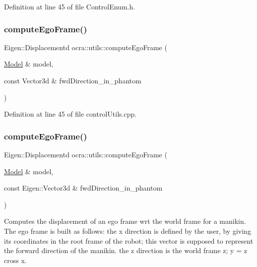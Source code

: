 Definition at line 45 of file Control\+Enum.\+h.

\hypertarget{namespaceocra_1_1utils_aaad3b464589711bcc5fecec8c8b9af76}{}\label{namespaceocra_1_1utils_aaad3b464589711bcc5fecec8c8b9af76} 
\subsubsection{\texorpdfstring{compute\+Ego\+Frame()}{computeEgoFrame()}\hspace{0.1cm}{\footnotesize\ttfamily [1/2]}}
{\footnotesize\ttfamily Eigen\+::\+Displacementd ocra\+::utils\+::compute\+Ego\+Frame (\begin{DoxyParamCaption}\item[{\hyperlink{classocra_1_1Model}{Model} \&}]{model,  }\item[{const Vector3d \&}]{fwd\+Direction\+\_\+in\+\_\+phantom }\end{DoxyParamCaption})}



Definition at line 45 of file control\+Utils.\+cpp.

\hypertarget{namespaceocra_1_1utils_a54960ab215262788c23ca1eee8786b5a}{}\label{namespaceocra_1_1utils_a54960ab215262788c23ca1eee8786b5a} 
\subsubsection{\texorpdfstring{compute\+Ego\+Frame()}{computeEgoFrame()}\hspace{0.1cm}{\footnotesize\ttfamily [2/2]}}
{\footnotesize\ttfamily Eigen\+::\+Displacementd ocra\+::utils\+::compute\+Ego\+Frame (\begin{DoxyParamCaption}\item[{\hyperlink{classocra_1_1Model}{Model} \&}]{model,  }\item[{const Eigen\+::\+Vector3d \&}]{fwd\+Direction\+\_\+in\+\_\+phantom }\end{DoxyParamCaption})}

Computes the displacement of an ego frame wrt the world frame for a manikin. The ego frame is built as follows\+: the x direction is defined by the user, by giving its coordinates in the root frame of the robot; this vector is supposed to represent the \textquotesingle{}forward\textquotesingle{} direction of the manikin. the z direction is the world frame z; y = z cross x. \hypertarget{namespaceocra_1_1utils_a02a6c3a9f1fe61b2ae034dee1b75a795}{}\label{namespaceocra_1_1utils_a02a6c3a9f1fe61b2ae034dee1b75a795} 
